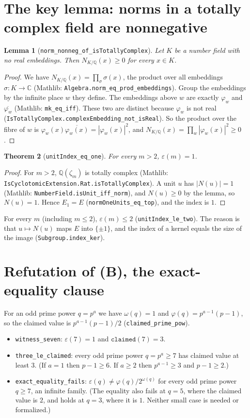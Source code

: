 \documentclass[11pt]{article}
\newtheorem{theorem}{Theorem}
\newtheorem{lemma}[theorem]{Lemma}
\theoremstyle{definition}
\newcommand{\Q}{\mathbb{Q}}
\newcommand{\C}{\mathbb{C}}
\begin{document}
\section{The key lemma: norms in a totally complex field are nonnegative}

\begin{lemma}[\texttt{norm\_nonneg\_of\_isTotallyComplex}]
Let $K$ be a number field with no real embeddings. Then $N_{K/\Q}(x)\ge 0$ for every $x\in K$.
\end{lemma}
\begin{proof}
We have $N_{K/\Q}(x)=\prod_{\sigma}\sigma(x)$, the product over all embeddings
$\sigma:K\to\C$ (Mathlib: \texttt{Algebra.norm\_eq\_prod\_embeddings}). Group the embeddings by
the infinite place $w$ they define. The embeddings above $w$ are exactly $\varphi_w$ and
$\overline{\varphi_w}$ (Mathlib: \texttt{mk\_eq\_iff}). These two are distinct because $\varphi_w$ is
not real (\texttt{IsTotallyComplex.complexEmbedding\_not\_isReal}). So the product over the fibre
of $w$ is $\varphi_w(x)\overline{\varphi_w(x)}=|\varphi_w(x)|^2$, and
$N_{K/\Q}(x)=\prod_w|\varphi_w(x)|^2\ge 0$.
\end{proof}

\begin{theorem}[\texttt{unitIndex\_eq\_one}]
For every $m>2$, $\varepsilon(m)=1$.
\end{theorem}
\begin{proof}
For $m>2$, $\Q(\zeta_m)$ is totally complex (Mathlib:
\texttt{IsCyclotomicExtension.Rat.isTotallyComplex}). A unit $u$ has $|N(u)|=1$ (Mathlib:
\texttt{NumberField.isUnit\_iff\_norm}), and $N(u)\ge 0$ by the lemma, so $N(u)=1$. Hence
$E_1=E$ (\texttt{normOneUnits\_eq\_top}), and the index is $1$.
\end{proof}

For every $m$ (including $m\le 2$), $\varepsilon(m)\le 2$ (\texttt{unitIndex\_le\_two}). The reason
is that $u\mapsto N(u)$ maps $E$ into $\{\pm1\}$, and the index of a kernel equals the size of the
image (\texttt{Subgroup.index\_ker}).

\section{Refutation of (B), the exact-equality clause}

For an odd prime power $q=p^a$ we have $\omega(q)=1$ and $\varphi(q)=p^{a-1}(p-1)$, so the claimed
value is $p^{a-1}(p-1)/2$ (\texttt{claimed\_prime\_pow}).
\begin{itemize}
\item \texttt{witness\_seven}: $\varepsilon(7)=1$ and $\texttt{claimed}(7)=3$.
\item \texttt{three\_le\_claimed}: every odd prime power $q=p^a\ge7$ has claimed value at least
$3$. (If $a=1$ then $p-1\ge6$. If $a\ge2$ then $p^{a-1}\ge3$ and $p-1\ge2$.)
\item \texttt{exact\_equality\_fails}: $\varepsilon(q)\ne\varphi(q)/2^{\omega(q)}$ for every odd
prime power $q\ge7$, an infinite family. (The equality also fails at $q=5$, where the claimed value
is $2$, and holds at $q=3$, where it is $1$. Neither small case is needed or formalized.)
\end{itemize}
\end{document}
